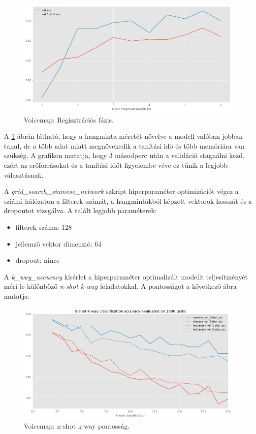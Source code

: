\begin{figure}[!ht]
	\centering
	\includegraphics[width=150mm, keepaspectratio]{figures/voicemap-wide-vs-tall.png}
	\caption{Voicemap: Regisztrációs fázis.}
	\label{fig:voicemap-wide-vs-tall}
\end{figure}

A \ref{fig:voicemap-wide-vs-tall} ábrán látható, hogy a hangminta méretét növelve a modell valóban jobban tanul, de a több adat miatt megnövekedik a tanítási idő és több memóriára van szükség. A grafikon mutatja, hogy 3 másodperc után a validáció stagnálni kezd, ezért az erőforrásokat és a tanítási időt figyelembe véve ez tűnik a legjobb választásnak.

A \emph{grid\_search\_siamese\_network} szkript hiperparaméter optimizációt végez a sziámi hálózaton a filterek számát, a hangmintákból képzett vektorok hosszát és a dropoutot vizsgálva. A talált legjobb paraméterek:

\begin{itemize}
	\item filterek száma: 128
	\item jellemző vektor dimenzió: 64
	\item dropout: nincs
\end{itemize}

A \emph{k\_way\_accuracy} kísérlet a hiperparaméter optimalizált modellt teljesítményét méri le különböző \emph{n-shot k-way} feladatokkal. A pontosságot a következő ábra mutatja:

\begin{figure}[!ht]
	\centering
	\includegraphics[width=150mm, keepaspectratio]{figures/voicemap-n-shot-k-way.png}
	\caption{Voicemap: n-shot k-way pontosság.}
	\label{fig:voicemap-n-shot-k-way}
\end{figure}

